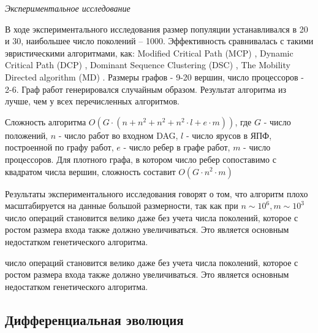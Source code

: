 \documentclass{article}
\begin{document}
\textit{Экспериментальное исследование} \par
В ходе экспериментального исследования размер популяции устанавливался в 20 и 30, наибольшее число поколений – 1000. Эффективность сравнивалась с такими эвристическими алгоритмами, как: Modified Critical Path (MCP) \cite{Wu_1990}, Dynamic Critical Path (DCP) \cite{Kwok_1996}, Dominant Sequence Clustering (DSC) \cite{Yang_1994}, The Mobility Directed algorithm (MD) \cite{Wu_1990}. Размеры графов - 9-20 вершин, число процессоров - 2-6. Граф работ генерировался случайным образом. Результат алгоритма из \cite{Mehdi_2015} лучше, чем у всех перечисленных алгоритмов. \par
Сложность алгоритма $O\left( G \cdot \left( n + n^2 + n^2 + n^2 \cdot l + e \cdot m \right) \right)$, где $G$ - число положений, $n$ - число работ во входном DAG, $l$ - число ярусов в ЯПФ, построенной по графу работ, $e$ - число ребер в графе работ, $m$ - число процессоров. Для плотного графа, в котором число ребер сопоставимо с квадратом числа вершин, сложность составит $O\left( G \cdot n^2 \cdot m \right)$ \par
Результаты экспериментального исследования говорят о том, что алгоритм плохо масштабируется на данные большой размерности, так как при $n \sim 10^6, m \sim 10^3$ число операций становится велико даже без учета числа поколений, которое с ростом размера входа также должно увеличиваться. Это является основным недостатком генетического алгоритма. \par
число операций становится велико даже без учета числа поколений, которое с ростом размера входа также должно увеличиваться. Это является основным недостатком генетического алгоритма.
\newpage

\subsection{Дифференциальная эволюция}
\end{document}
